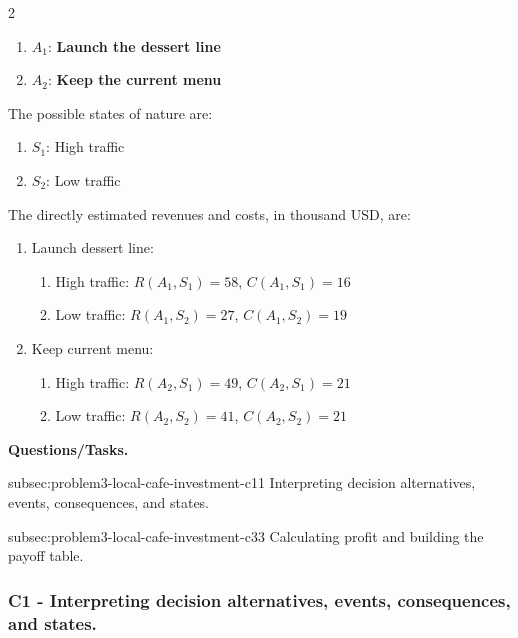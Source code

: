 \begin{multicols}{2}
	\begin{enumerate}[label=\arabic*.]
		\item \(A_1\): \textbf{Launch the dessert line}
		\item \(A_2\): \textbf{Keep the current menu}
	\end{enumerate}
	
	The possible states of nature are:
	\begin{enumerate}[label=\arabic*.]
		\item \(S_1\): High traffic
		\item \(S_2\): Low traffic
	\end{enumerate}
	
	\columnbreak
	
	The directly estimated revenues and costs, in thousand USD, are:
	\begin{enumerate}[label=\arabic*.]
		\item Launch dessert line:
		\begin{enumerate}[label=\roman*)]
			\item High traffic:
			\(R(A_1,S_1)=58\), \(C(A_1,S_1)=16\)
			
			\item Low traffic:
			\(R(A_1,S_2)=27\), \(C(A_1,S_2)=19\)
		\end{enumerate}
		
		\item Keep current menu:
		\begin{enumerate}[label=\roman*)]
			\item High traffic:
			\(R(A_2,S_1)=49\), \(C(A_2,S_1)=21\)
			
			\item Low traffic:
			\(R(A_2,S_2)=41\), \(C(A_2,S_2)=21\)
		\end{enumerate}
	\end{enumerate}
\end{multicols}

\textbf{Questions/Tasks.}
\begin{enumerate}
	\CriterionTask
	{subsec:problem3-local-cafe-investment-c1}{1}
	{Interpreting decision alternatives, events, consequences, and states.}

	\CriterionTask
	{subsec:problem3-local-cafe-investment-c3}{3}
	{Calculating profit and building the payoff table.}
\end{enumerate}

\subsubsection*{C1 - Interpreting decision alternatives, events, consequences, and states.}
\label{subsec:problem3-local-cafe-investment-c1}

